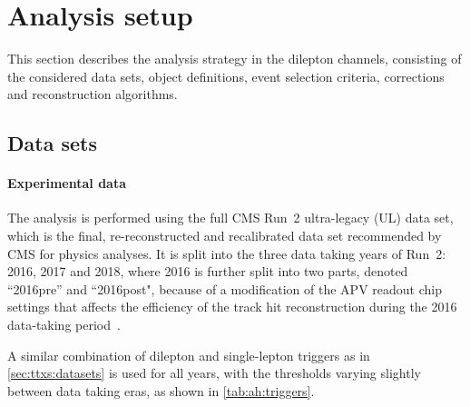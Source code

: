 \section{Analysis setup}
\label{sec:ah:setup}

This section describes the analysis strategy in the dilepton channels, consisting of the considered data sets, object definitions, event selection criteria, corrections and reconstruction algorithms.

\subsection{Data sets}
\label{sec:ah:datasets}

\paragraph{Experimental data} 
The analysis is performed using the full CMS Run~2 ultra-legacy (UL) data set, which is the final, re-reconstructed and recalibrated data set recommended by CMS for physics analyses. It is split into the three data taking years of Run~2: 2016, 2017 and 2018, where 2016 is further split into two parts, denoted ``2016pre'' and ``2016post", because of a modification of the APV readout chip settings that affects the efficiency of the track hit reconstruction during the 2016 data-taking period~\cite{CMS-DP-2020-045}.

A similar combination of dilepton and single-lepton triggers as in \cref{sec:ttxs:datasets} is used for all years, with the \pt thresholds varying slightly between data taking eras, as shown in \cref{tab:ah:triggers}. 

